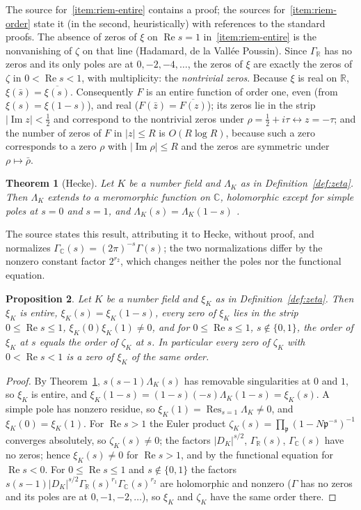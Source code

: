\documentclass[11pt]{amsart}
\theoremstyle{plain}
\newtheorem{theorem}{Theorem}[section]
\newtheorem{proposition}[theorem]{Proposition}
\theoremstyle{definition}
\theoremstyle{remark}
\numberwithin{equation}{section}
\newcommand{\C}{\mathbb{C}}
\newcommand{\R}{\mathbb{R}}
\newcommand{\GR}{\Gamma_{\mathbb{R}}}
\newcommand{\GC}{\Gamma_{\mathbb{C}}}
\DeclareMathOperator{\Ima}{Im}
\DeclareMathOperator{\Rea}{Re}
\renewcommand{\Re}{\Rea}
\renewcommand{\Im}{\Ima}
\begin{document}
The source for~\ref{item:riem-entire} contains a proof; the sources
for~\ref{item:riem-order} state it (in the second, heuristically) with
references to the standard proofs. The absence of zeros of $\xi$ on
$\Re s=1$ in~\ref{item:riem-entire} is the nonvanishing of $\zeta$ on
that line (Hadamard, de la Vall\'ee Poussin). Since $\GR$ has no zeros
and its only poles are at $0,-2,-4,\dots$, the zeros of $\xi$ are
exactly the zeros of $\zeta$ in $0<\Re s<1$, with multiplicity: the
\emph{nontrivial zeros}. Because $\xi$ is real on $\R$,
$\xi(\bar s)=\overline{\xi(s)}$. Consequently $F$ is an entire function
of order one, even (from $\xi(s)=\xi(1-s)$), and real
($F(\bar z)=\overline{F(z)}$); its zeros lie in the strip
$|\Im z|<\tfrac12$ and correspond to the nontrivial zeros under
$\rho=\tfrac12+i\tau\leftrightarrow z=-\tau$; and the number of zeros
of $F$ in $|z|\le R$ is $O(R\log R)$, because such a zero corresponds
to a zero $\rho$ with $|\Im\rho|\le R$ and the zeros are symmetric
under $\rho\mapsto\bar\rho$.

\begin{theorem}[Hecke]\label{thm:imp-hecke}
Let $K$ be a number field and $\Lambda_K$ as in
Definition~\ref{def:zeta}. Then $\Lambda_K$ extends to a meromorphic
function on $\C$, holomorphic except for simple poles at $s=0$ and
$s=1$, and $\Lambda_K(s)=\Lambda_K(1-s)$
\cite[Remark~19.13]{Sutherland2017Lecture19}.
\end{theorem}

The source states this result, attributing it to Hecke, without proof,
and normalizes $\GC(s)=(2\pi)^{-s}\Gamma(s)$; the two normalizations
differ by the nonzero constant factor $2^{r_2}$, which changes neither
the poles nor the functional equation.

\begin{proposition}\label{prop:xiK}
Let $K$ be a number field and $\xi_K$ as in Definition~\ref{def:zeta}.
Then $\xi_K$ is entire, $\xi_K(s)=\xi_K(1-s)$, every zero of $\xi_K$
lies in the strip $0\le\Re s\le1$, $\xi_K(0)\xi_K(1)\ne0$, and for
$0\le\Re s\le1$, $s\notin\{0,1\}$, the order of $\xi_K$ at $s$ equals
the order of $\zeta_K$ at $s$. In particular every zero of $\zeta_K$
with $0<\Re s<1$ is a zero of $\xi_K$ of the same order.
\end{proposition}

\begin{proof}
By Theorem~\ref{thm:imp-hecke}, $s(s-1)\Lambda_K(s)$ has removable
singularities at $0$ and $1$, so $\xi_K$ is entire, and
$\xi_K(1-s)=(1-s)(-s)\Lambda_K(1-s)=\xi_K(s)$. A simple pole has
nonzero residue, so $\xi_K(1)=\operatorname{Res}_{s=1}\Lambda_K\ne0$,
and $\xi_K(0)=\xi_K(1)$. For $\Re s>1$ the Euler product
$\zeta_K(s)=\prod_{\mathfrak p}(1-N\mathfrak p^{-s})^{-1}$ converges
absolutely, so $\zeta_K(s)\ne0$; the factors $|D_K|^{s/2}$, $\GR(s)$,
$\GC(s)$ have no zeros; hence $\xi_K(s)\ne0$ for $\Re s>1$, and by the
functional equation for $\Re s<0$. For $0\le\Re s\le1$ and
$s\notin\{0,1\}$ the factors $s(s-1)|D_K|^{s/2}\GR(s)^{r_1}
\GC(s)^{r_2}$ are holomorphic and nonzero ($\Gamma$ has no zeros and
its poles are at $0,-1,-2,\dots$), so $\xi_K$ and $\zeta_K$ have the
same order there.
\end{proof}
\end{document}
